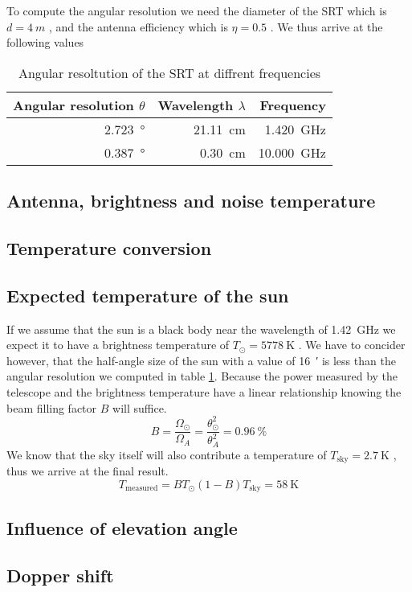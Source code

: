 To compute the angular resolution we need the diameter of the SRT which is $d = \SI{4}{m}$ \cite[p. 4]{srt}, and the antenna efficiency which is $\eta = 0.5$ \cite[p. 2]{srt}.
We thus arrive at the following values
\begin{table}[h]
    \centering
    \begin{tabular}{rrr}
        \toprule
        Angular resolution $\theta$ & Wavelength $\lambda$ & Frequency\\
        \midrule
        \SI{2.723}{\degree} & \SI{21.11}{cm} & \SI{1.420}{\giga \hertz}\\
        \SI{0.387}{\degree} & \SI{0.30}{cm} & \SI{10.000}{\giga \hertz}\\
        \bottomrule
    \end{tabular}
    \caption{Angular resoltution of the SRT at diffrent frequencies}
    \label{tab:ang_res}
\end{table}


\subsection{Antenna, brightness and noise temperature}

\subsection{Temperature conversion}

\subsection{Expected temperature of the sun}
If we assume that the sun is a black body near the wavelength of \SI{1.42}{\giga\hertz} we expect it to have a brightness temperature of $T_{\odot} = \SI{5778}{\kelvin}$ \cite[p. 211]{ftb}.
We have to concider however, that the half-angle size of the sun with a value of \SI{16}{\arcminute} \cite[p. 211]{ftb} is less than the angular resolution we computed in table \ref{tab:ang_res}.
Because the power measured by the telescope and the brightness temperature have a linear relationship knowing the beam filling factor $B$ will suffice.
\begin{equation}
    B = \frac{\Omega_{\odot}}{\Omega_A} = \frac{\theta_{\odot}^2}{\theta_A^2} = \SI{0.96
    }{\percent}
\end{equation}
We know that the sky itself will also contribute a temperature of $T_{\text{sky}} = \SI{2.7}{\kelvin}$ \cite[p. 4]{script}, thus we arrive at the final result.
\begin{equation}
    T_{\text{measured}} = B T_{\odot} (1-B) T_{\text{sky}} = \SI{58}{\kelvin}
\end{equation}


\subsection{Influence of elevation angle}

\subsection{Dopper shift}